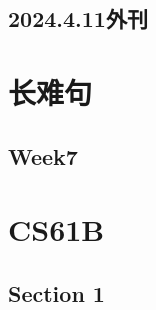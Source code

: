 \documentclass[12pt, a4paper, oneside]{ctexbook}
\begin{document}
\section{2024.4.11外刊}


\chapter{长难句}
\section{Week7}


\chapter{CS61B}
\section{Section 1}

\end{document}
